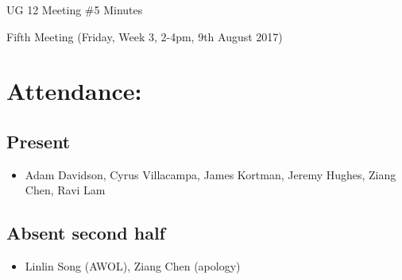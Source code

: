 \documentclass{article}
\begin{document}
\begin{adjustwidth}{2.5em}{0pt}
\begin{center}
\Large{UG 12 Meeting \#5 Minutes}\\
\end{center}
\end{adjustwidth}


Fifth Meeting (Friday, Week 3, 2-4pm, 9th August 2017)
\section{Attendance:}
\subsection*{Present}
\begin{itemize}
\item Adam Davidson, Cyrus Villacampa, James Kortman, Jeremy Hughes, Ziang Chen, Ravi Lam
\end{itemize}
\subsection*{Absent second half}
\begin{itemize}
\item Linlin Song (AWOL), Ziang Chen (apology)
\end {itemize}
\end{document}
